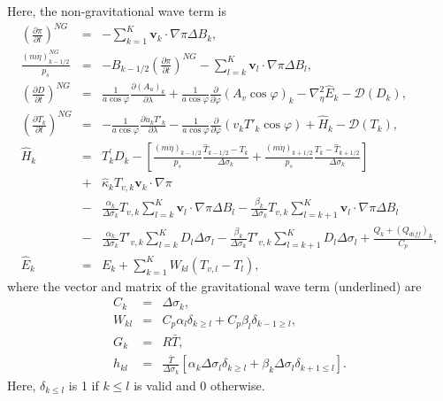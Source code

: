 Here, the non-gravitational wave term is
\begin{eqnarray}
  \left( \frac{\partial \pi}{\partial t} \right)^{NG}
   &=&   - \sum_{k=1}^{K} {\mathbf{v}}_{k} \cdot \nabla \pi  
       \Delta B_{k}, \\
  \frac{(m\dot{\eta})^{NG}_{k-1/2}}{p_s}
 &=& - B_{k-1/2} \left( \frac{\partial \pi}{\partial t} \right)^{NG}
   - \sum_{l=k}^{K} {\mathbf{v}}_{l} \cdot \nabla \pi
       \Delta B_{l}, \\
  \left( \frac{\partial D}{\partial t} \right)^{NG}
       &=&   \frac{1}{a\cos\varphi}
            \frac{\partial (A_u)_{k}}{\partial \lambda}
          + \frac{1}{a\cos\varphi}
            \frac{\partial }{\partial \varphi} (A_v \cos\varphi)_k
          - \nabla^{2}_{\eta} \hat{E}_{k} 
          - {\mathcal D}(D_{k}), \\
  \left( \frac{\partial T_{k}}{\partial t} \right)^{NG} 
      &=&   - \frac{1}{a\cos\varphi} 
               \frac{\partial u_k T'_k}{\partial \lambda}
          - \frac{1}{a\cos\varphi}
               \frac{\partial }{\partial \varphi} (v_k T'_k \cos\varphi)
          + \hat{H}_{k} 
          - {\mathcal D}(T_{k}), \\
 \hat{H}_k  &=&  T_{k}^{\prime} D_{k} - \left[   \frac{(m\dot{\eta})_{k-1/2}}{p_s} \frac{\hat{T}_{k-1/2} - T_k}{\Delta\sigma_k}
               + \frac{(m\dot{\eta})_{k+1/2}}{p_s} \frac{T_k - \hat{T}_{k+1/2}}{\Delta\sigma_k} \right] \\
         &+& \hat{\kappa}_{k} T_{v,k} {\mathbf{v}}_{k} \cdot \nabla \pi \\
         &-& \frac{\alpha_{k}}{\Delta \sigma_{k} } T_{v,k}
             \sum_{l=k}^{K} {\mathbf{v}}_{l} \cdot \nabla \pi 
               \Delta B_{l}
           - \frac{\beta_{k}}{\Delta \sigma_{k} } T_{v,k}
             \sum_{l=k+1}^{K} {\mathbf{v}}_{l} \cdot \nabla \pi 
               \Delta B_{l} \\
        &-& \frac{\alpha_{k}}{\Delta \sigma_{k} } T'_{v,k}
             \sum_{l=k}^{K} D_l  \Delta \sigma_{l}
           - \frac{\beta_{k}}{\Delta \sigma_{k} } T'_{v,k}
             \sum_{l=k+1}^{K} D_l  \Delta \sigma_{l}
         + \frac{Q_k + (Q_{diff})_k}{C_p}, \\
  \hat{E}_k &=& E_{k} 
            + \sum_{k=1}^{K} W_{kl} ( T_{v,l}-T_{l} ),
\end{eqnarray}
where the vector and matrix of the gravitational wave term (underlined)
are
\begin{eqnarray}
  C_{k} &=& \Delta \sigma_{k}, \\
  W_{kl} &=& C_{p} \alpha_{l} \delta_{k \geq l}
         + C_{p} \beta_{l} \delta_{k-1 \geq l}, \\
  G_{k} &=& R\bar{T}, \\
h_{kl} &=& \frac{\bar{T}}{\Delta\sigma_k}\left[\alpha_k \Delta\sigma_l \delta_{k\ge l}+\beta_k \Delta\sigma_l \delta_{k+1\le l}\right].
\end{eqnarray}
Here, \(\delta_{k \leq l}\) is 1 if \(k \leq l\) is valid and 0
otherwise.\\

